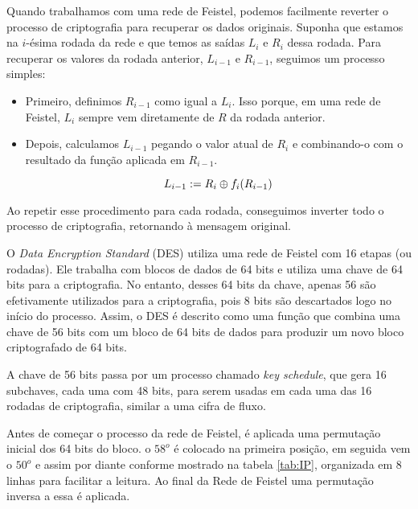Quando trabalhamos com uma rede de Feistel, podemos facilmente reverter o processo de criptografia para recuperar os dados originais.
Suponha que estamos na $i$-ésima rodada da rede e que temos as saídas $L_i$ e $R_i$ dessa rodada.
Para recuperar os valores da rodada anterior, $L_{i-1}$ e $R_{i-1}$, seguimos um processo simples:

\begin{itemize}
\item Primeiro, definimos $R_{i-1}$ como igual a $L_i$.
  Isso porque, em uma rede de Feistel, $L_i$ sempre vem diretamente de $R$ da rodada anterior.
\item Depois, calculamos $L_{i-1}$ pegando o valor atual de $R_i$ e combinando-o com o resultado da função aplicada em $R_{i-1}$.

  \begin{displaymath}
    L_{i-1} := R_i \oplus f_i(R_{i-1})
  \end{displaymath}
\end{itemize}

Ao repetir esse procedimento para cada rodada, conseguimos inverter todo o processo de criptografia, retornando à mensagem original.

O \textit{Data Encryption Standard} (DES) utiliza uma rede de Feistel com 16 etapas (ou rodadas).
Ele trabalha com blocos de dados de 64 bits e utiliza uma chave de 64 bits para a criptografia.
No entanto, desses 64 bits da chave, apenas 56 são efetivamente utilizados para a criptografia, pois 8 bits são descartados logo no início do processo.
Assim, o DES é descrito como uma função que combina uma chave de 56 bits com um bloco de 64 bits de dados para produzir um novo bloco criptografado de 64 bits.

A chave de 56 bits passa por um processo chamado \textit{key schedule}, que gera 16 subchaves, cada uma com 48 bits, para serem usadas em cada uma das 16 rodadas de criptografia, similar a uma cifra de fluxo.

Antes de começar o processo da rede de Feistel, é aplicada uma permutação inicial dos 64 bits do bloco.
o $58^o$ é colocado na primeira posição, em seguida vem o $50^o$ e assim por diante conforme mostrado na tabela \ref{tab:IP}, organizada em 8 linhas para facilitar a leitura.
Ao final da Rede de Feistel uma permutação inversa a essa é aplicada.


